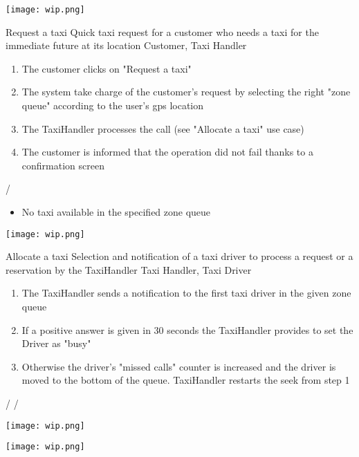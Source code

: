 \pagebreak
\texttt{[image: wip.png]}

\usecase
{Request a taxi}
{Quick taxi request for a customer who needs a taxi for the immediate future at its location}
{Customer, Taxi Handler}
{
\begin{enumerate}
	\item The customer clicks on "Request a taxi"
	\item The system take charge of the customer's request by selecting the right "zone queue" according to the user's gps location
	\item The TaxiHandler processes the call (see "Allocate a taxi" use case)
	\item The customer is informed that the operation did not fail thanks to a confirmation screen
\end{enumerate}
}
{
/
}
{ 
\begin{itemize}
\item No taxi available in the specified zone queue
\end{itemize}
}

\pagebreak
\texttt{[image: wip.png]}

\usecase
{Allocate a taxi}
{Selection and notification of a taxi driver to process a request or a reservation by the TaxiHandler}
{Taxi Handler, Taxi Driver}
{
\begin{enumerate}
	\item The TaxiHandler sends a notification to the first taxi driver in the given zone queue
	\item If a positive answer is given in 30 seconds the TaxiHandler provides to set the Driver as "busy"
	\item Otherwise the driver's "missed calls" counter is increased and the driver is moved to the bottom of the queue. TaxiHandler restarts the seek from step 1
\end{enumerate}
}
{
/
}
{ 
/
}

\pagebreak
\texttt{[image: wip.png]}

\pagebreak
\texttt{[image: wip.png]}